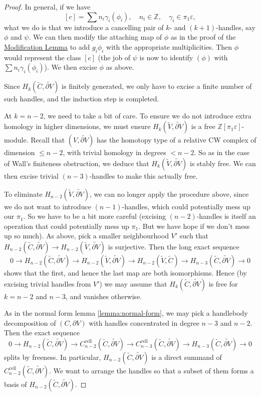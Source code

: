 \documentclass[a4paper, 12pt]{article}
\theoremstyle{definition}
\newcommand\Z{\mathbb{Z}}
\newcommand\cell{\mathrm{cell}}
\begin{document}
\begin{proof}
  In general, if we have
  \[
    [c] = \sum n_i \gamma_i (\phi_i),\quad n_i \in \Z,\quad \gamma_i \in \pi_1 \varepsilon,
  \]
  what we do is that we introduce a cancelling pair of $k$- and $(k + 1)$-handles, say $\phi$ and $\psi$. We can then modify the attaching map of $\phi$ as in the proof of the \hyperref[lemma:modification]{Modification Lemma} to add $g_i \phi_i$ with the appropriate multiplicities. Then $\phi$ would represent the class $[c]$ (the job of $\psi$ is now to identify $(\phi)$ with $\sum n_i \gamma_i (\phi_i)$). We then excise $\phi$ as above.

  Since $H_k(\tilde{C}, \widetilde{\partial V})$ is finitely generated, we only have to excise a finite number of such handles, and the induction step is completed.

  At $k = n - 2$, we need to take a bit of care. To ensure we do not introduce extra homology in higher dimensions, we must ensure $H_k(\tilde{V}, \widetilde{\partial V})$ is a free $\Z[\pi_1 \varepsilon]$-module. Recall that $(V, \tilde{\partial V})$ has the homotopy type of a relative CW complex of dimension $\leq n - 2$, with trivial homology in degrees $< n - 2$. So as in the case of Wall's finiteness obstruction, we deduce that $H_k(\tilde{V}, \widetilde{\partial V})$ is stably free. We can then excise trivial $(n - 3)$-handles to make this actually free.

  To eliminate $H_{n - 2}(\tilde{V}, \widetilde{\partial V})$, we can no longer apply the procedure above, since we do not want to introduce $(n - 1)$-handles, which could potentially mess up our $\pi_1$. So we have to be a bit more careful (excising $(n - 2)$-handles is itself an operation that could potentially mess up $\pi_1$. But we have hope if we don't mess up so much). As above, pick a smaller neighbourhood $V'$ such that $H_{n - 2}(\tilde{C}, \widetilde{\partial V}) \to H_{n - 2}(\tilde{V}, \widetilde{\partial V})$ is surjective. Then the long exact sequence
  \[
    0 \to H_{n - 2}(\tilde{C}, \widetilde{\partial V}) \to H_{n - 2}(\tilde{V}, \widetilde{\partial V}) \to H_{n - 2}(\tilde{V}, \tilde{C}) \to H_{n - 3}(\tilde{C}, \widetilde{\partial V}) \to 0
  \]
  shows that the first, and hence the last map are both isomorphisms. Hence (by excising trivial handles from $V'$) we may assume that $H_k(\tilde{C}, \widetilde{\partial V})$ is free for $k = n - 2$ and $n - 3$, and vanishes otherwise.

  As in the normal form lemma \ref{lemma:normal-form}, we may pick a handlebody decomposition of $(C, \partial V)$ with handles concentrated in degree $n - 3$ and $n - 2$. Then the exact sequence
  \[
    0 \to H_{n - 2}(\tilde{C}, \widetilde{\partial V}) \to C^{\cell}_{n - 2}(\tilde{C}, \widetilde{\partial V}) \to C^{\cell}_{n - 3}(\tilde{C}, \widetilde{\partial V}) \to H_{n-3}(\tilde{C}, \widetilde{\partial V}) \to 0
  \]
  splits by freeness. In particular, $H_{n - 2}(\tilde{C}, \widetilde{\partial V})$ is a direct summand of $C^{\cell}_{n-2}(\tilde{C}, \widetilde{\partial V})$. We want to arrange the handles so that a subset of them forms a basis of $H_{n - 2}(\tilde{C}, \widetilde{\partial V})$.
  

\end{proof}
\end{document}
